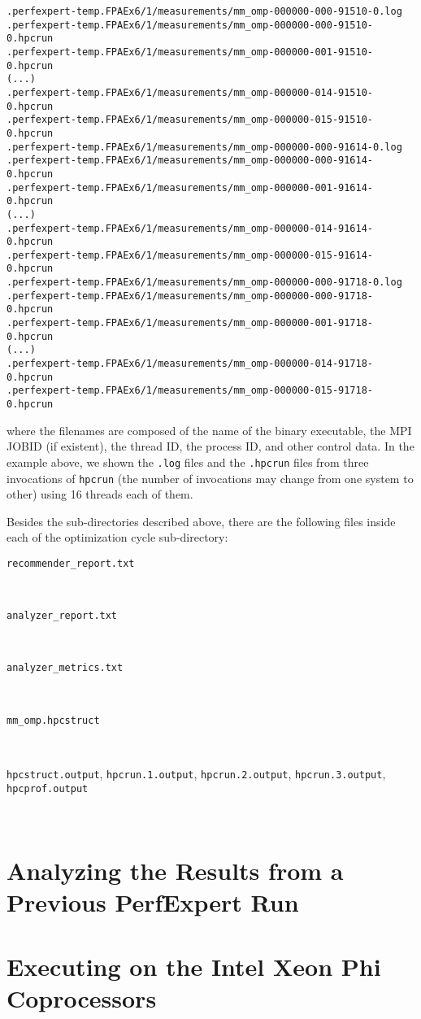 \begin{lstlisting}[breaklines]
.perfexpert-temp.FPAEx6/1/measurements/mm_omp-000000-000-91510-0.log
.perfexpert-temp.FPAEx6/1/measurements/mm_omp-000000-000-91510-0.hpcrun
.perfexpert-temp.FPAEx6/1/measurements/mm_omp-000000-001-91510-0.hpcrun
(...)
.perfexpert-temp.FPAEx6/1/measurements/mm_omp-000000-014-91510-0.hpcrun
.perfexpert-temp.FPAEx6/1/measurements/mm_omp-000000-015-91510-0.hpcrun
.perfexpert-temp.FPAEx6/1/measurements/mm_omp-000000-000-91614-0.log
.perfexpert-temp.FPAEx6/1/measurements/mm_omp-000000-000-91614-0.hpcrun
.perfexpert-temp.FPAEx6/1/measurements/mm_omp-000000-001-91614-0.hpcrun
(...)
.perfexpert-temp.FPAEx6/1/measurements/mm_omp-000000-014-91614-0.hpcrun
.perfexpert-temp.FPAEx6/1/measurements/mm_omp-000000-015-91614-0.hpcrun
.perfexpert-temp.FPAEx6/1/measurements/mm_omp-000000-000-91718-0.log
.perfexpert-temp.FPAEx6/1/measurements/mm_omp-000000-000-91718-0.hpcrun
.perfexpert-temp.FPAEx6/1/measurements/mm_omp-000000-001-91718-0.hpcrun
(...)
.perfexpert-temp.FPAEx6/1/measurements/mm_omp-000000-014-91718-0.hpcrun
.perfexpert-temp.FPAEx6/1/measurements/mm_omp-000000-015-91718-0.hpcrun
\end{lstlisting}

\noindent where the filenames are composed of the name of the binary executable, the MPI JOBID (if existent), the thread ID, the process ID, and other control data. In the example above, we shown the \texttt{.log} files and the \texttt{.hpcrun} files from three invocations of \texttt{hpcrun} (the number of invocations may change from one system to other) using 16 threads each of them.

Besides the sub-directories described above, there are the following files inside each of the optimization cycle sub-directory:

\begin{description}
	\item[\texttt{recommender\_report.txt}]\hfill \\

	\item[\texttt{analyzer\_report.txt}]\hfill \\

	\item[\texttt{analyzer\_metrics.txt}]\hfill \\

	\item[\texttt{mm\_omp.hpcstruct}]\hfill \\

	\item[\texttt{hpcstruct.output}, \texttt{hpcrun.1.output}, \texttt{hpcrun.2.output}, \texttt{hpcrun.3.output}, \texttt{hpcprof.output}]\hfill \\

\end{description}

\section{Analyzing the Results from a Previous PerfExpert Run}

\section{Executing on the Intel\textsuperscript{\textregistered} Xeon Phi\textsuperscript{\texttrademark} Coprocessors}

